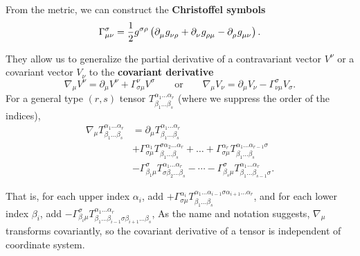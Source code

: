 From the metric, we can construct the \textbf{Christoffel symbols}
\begin{equation}
	\Gamma^\sigma_{\mu \nu} = \frac{1}{2} g\indices{^\sigma^\rho} \left(
		\partial\indices{_\mu} g\indices{_\nu_\rho} +
		\partial\indices{_\nu} g\indices{_\rho_\mu} -
		\partial\indices{_\rho} g\indices{_\mu_\nu}
	\right) .
	\label{eq:def_christoffel}
\end{equation}

They allow us to generalize the partial derivative of a contravariant vector $V^\nu$ or a covariant vector $V_\nu$ to the \textbf{covariant derivative}
\begin{equation*}
	\nabla_\mu V^\nu = \partial_\mu V^\nu + \Gamma_{\sigma \mu}^\nu V^\sigma
	\qquad \text{or} \qquad
	\nabla_\mu V_\nu = \partial_\mu V_\nu - \Gamma_{\nu \mu}^\sigma V_\sigma
	.
\end{equation*}
For a general type $(r,s)$ tensor $T^{\alpha_1 \ldots \alpha_r}_{\beta_1 \ldots \beta_s}$ (where we suppress the order of the indices),
\begin{equation}
\begin{split}
	\nabla_\mu T^{\alpha_1 \ldots \alpha_r}_{\beta_1 \ldots \beta_s} &= \partial_\mu T^{\alpha_1 \ldots \alpha_r}_{\beta_1 \ldots \beta_s} \\
	                                                                 &+ \Gamma^{\alpha_1}_{\sigma\mu} T^{\sigma \alpha_2 \ldots \alpha_r}_{\beta_1 \ldots \beta_s} + \dots + \Gamma^{\alpha_r}_{\sigma\mu} T^{\alpha_1 \ldots \alpha_{r-1}\sigma}_{\beta_1 \ldots \beta_s} \\
	                                                                 &- \Gamma^\sigma_{\beta_1 \mu} T^{\alpha_1 \ldots \alpha_r}_{\sigma \beta_2 \ldots \beta_s} - \cdots - \Gamma^\sigma_{\beta_s \mu} T^{\alpha_1 \ldots \alpha_r}_{\beta_1 \ldots \beta_{s-1} \sigma}.
	\label{eq:def_cov_deriv}
\end{split}
\end{equation}
\iffalse
\begin{align}
	\nabla_c T\indices{^{a_1 \ldots a_r}_{b_1 \ldots b_s}} &= \partial_c {T^{a_1 \ldots a_r}}_{b_1 \ldots b_s} \\
	                                                       &+ \Gamma^{a_1}_{dc} T\indices{^{d a_2 \ldots a_r}_{b_1 \ldots b_s}} + \dots + \Gamma^{a_r}_{dc} T\indices{^{a_1 \ldots a_{r-1}d}_{b_1 \ldots b_s}} \\
	                                                       &- {\Gamma^d}_{b_1 c} {T^{a_1 \ldots a_r}}_{d b_2 \ldots b_s} - \cdots - {\Gamma^d}_{b_s c} {T^{a_1 \ldots a_r}}_{b_1 \ldots b_{s-1} d}.
	\label{eq:def_cov_deriv}
\end{align}
\fi
That is, for each upper index $\alpha_i$, add $+\Gamma^{\alpha_i}_{\sigma \mu} T^{\alpha_1 \ldots \alpha_{i-1} \sigma \alpha_{i+1} \ldots \alpha_r}_{\beta_1 \ldots \beta_s}$,
and for each lower index $\beta_i$, add $-\Gamma^{\sigma}_{\beta_i \mu} T^{\alpha_1 \ldots \alpha_r}_{\beta_1 \ldots \beta_{i-1} \sigma \beta_{i+1} \ldots \beta_s}$,
As the name and notation suggests, $\nabla_\mu$ transforms covariantly, so the covariant derivative of a tensor is independent of coordinate system.

